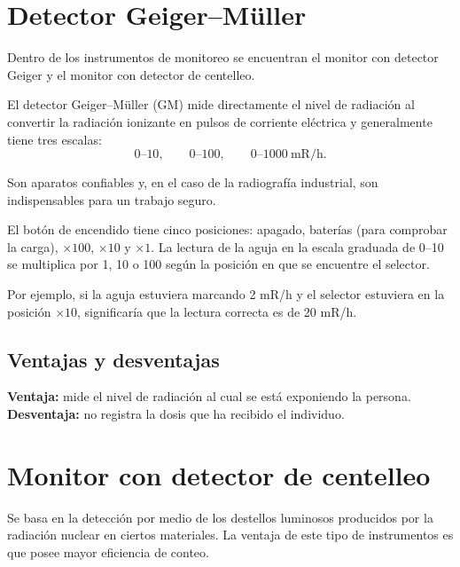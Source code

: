 \section{Detector Geiger--Müller}

Dentro de los instrumentos de monitoreo se encuentran el monitor con detector Geiger y el monitor con detector de centelleo.

El detector Geiger--Müller (GM) mide directamente el nivel de radiación al convertir la radiación ionizante en pulsos de corriente eléctrica y generalmente tiene tres escalas:
\[
0\text{--}10,\qquad 0\text{--}100,\qquad 0\text{--}1000\ \mathrm{mR/h}.
\]

Son aparatos confiables y, en el caso de la radiografía industrial, son indispensables para un trabajo seguro.

El botón de encendido tiene cinco posiciones: apagado, baterías (para comprobar la carga), $\times 100$, $\times 10$ y $\times 1$. La lectura de la aguja en la escala graduada de 0--10 se multiplica por 1, 10 o 100 según la posición en que se encuentre el selector.

Por ejemplo, si la aguja estuviera marcando 2 mR/h y el selector estuviera en la posición $\times 10$, significaría que la lectura correcta es de 20 mR/h.

\subsection{Ventajas y desventajas}

\textbf{Ventaja:} mide el nivel de radiación al cual se está exponiendo la persona.\\
\textbf{Desventaja:} no registra la dosis que ha recibido el individuo.

\section{Monitor con detector de centelleo}

Se basa en la detección por medio de los destellos luminosos producidos por la radiación nuclear en ciertos materiales. La ventaja de este tipo de instrumentos es que posee mayor eficiencia de conteo.
